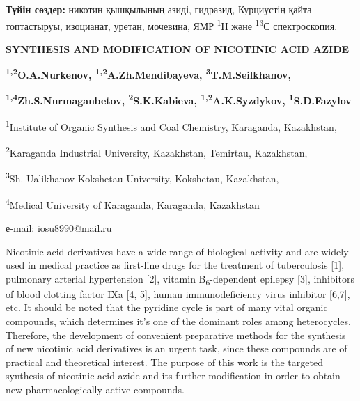 {\bfseries Түйін сөздер:} никотин қышқылының азиді, гидразид, Курциустің
қайта топтастыруы, изоцианат, уретан, мочевина, ЯМР \textsuperscript{1}Н
және \textsuperscript{13}С спектроскопия.

{\bfseries SYNTHESIS AND MODIFICATION OF NICOTINIC ACID AZIDE}

{\bfseries \textsuperscript{1,2}O.A.Nurkenov,
\textsuperscript{1,2}A.Zh.Mendibayeva,
\textsuperscript{3}T.M.Seilkhanov,}

{\bfseries \textsuperscript{1,4}Zh.S.Nurmaganbetov,
\textsuperscript{2}S.K.Kabieva, \textsuperscript{1,2}A.K.Syzdykov,
\textsuperscript{1}S.D.Fazylov}

\textsuperscript{1}Institute of Organic Synthesis and Coal Chemistry,
Karaganda, Kazakhstan,

\textsuperscript{2}Karaganda Industrial University, Kazakhstan,
Temirtau, Kazakhstan,

\textsuperscript{3}Sh. Ualikhanov Kokshetau University, Kokshetau,
Kazakhstan,

\textsuperscript{4}Medical University of Karaganda, Karaganda,
Kazakhstan

е-mail: iosu8990@mail.ru

Nicotinic acid derivatives have a wide range of biological activity and
are widely used in medical practice as first-line drugs for the
treatment of tuberculosis {[}1{]}, pulmonary arterial hypertension
{[}2{]}, vitamin B\textsubscript{6}-dependent epilepsy {[}3{]},
inhibitors of blood clotting factor IXa {[}4, 5{]}, human
immunodeficiency virus inhibitor {[}6,7{]}, etc. It should be noted that
the pyridine cycle is part of many vital organic compounds, which
determines it's one of the dominant roles among heterocycles. Therefore,
the development of convenient preparative methods for the synthesis of
new nicotinic acid derivatives is an urgent task, since these compounds
are of practical and theoretical interest. The purpose of this work is
the targeted synthesis of nicotinic acid azide and its further
modification in order to obtain new pharmacologically active compounds.

